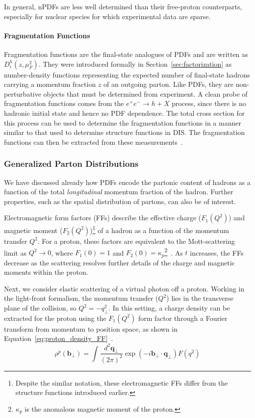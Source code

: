 In general, nPDFs are less well determined than their free-proton counterparts, especially for nuclear species for which experimental data are sparse.

\FloatBarrier
\paragraph{Fragmentation Functions}
Fragmentation functions are the final-state analogues of PDFs and are written as $D_i^h(z,\mu_F^2)$.
They were introduced formally in Section~\ref{sec:factorization} as number-density functions representing the expected number of final-state hadrons carrying a momentum fraction $z$ of an outgoing parton.
Like PDFs, they are non-perturbative objects that must be determined from experiment.
A clean probe of fragmentation functions comes from the $e^+e^-\rightarrow h+X$ process, since there is no hadronic initial state and hence no PDF dependence.
The total cross section for this process can be used to determine the fragmentation functions in a manner similar to that used to determine structure functions in DIS.
The fragmentation functions can then be extracted from these measurements~\cite{pdg}.

\subsubsection{Generalized Parton Distributions}

We have discussed already how PDFs encode the partonic content of hadrons as a function of the total \textit{longitudinal} momentum fraction of the hadron.
Further properties, such as the spatial distribution of partons, can also be of interest.

Electromagnetic form factors (FFs) describe the effective charge ($F_1(Q^2)$) and magnetic moment ($F_2(Q^2)$)\footnote{Despite the similar notation, these electromagnetic FFs differ from the structure functions introduced earlier.} of a hadron as a function of the momentum transfer $Q^2$.
For a proton, these factors are equivalent to the Mott-scattering limit as $Q^2\rightarrow0$, where $F_1(0)=1$ and $F_2(0)=\kappa_p$\footnote{$\kappa_p$ is the anomalous magnetic moment of the proton.}~\cite{EMFF}.
As $t$ increases, the FFs decrease as the scattering resolves further details of the charge and magnetic moments within the proton.

Next, we consider elastic scattering of a virtual photon off a proton.
Working in the light-front formalism, the momentum transfer ($Q^2$) lies in the transverse plane of the collision, so $Q^2 = -q^2_\perp$.
In this setting, a charge density can be extracted for the proton using the $F_1(Q^2)$ form factor through a Fourier transform from momentum to position space, as shown in Equation~\ref{eq:proton_density_FF}~\cite{Brodsky:CT}.
\begin{equation}
    \label{eq:proton_density_FF}
    \rho^p (\mathbf{b}_\perp) = \int \frac{d^2\mathbf{q}_\perp}{(2\pi)^2} \exp{\left(-i\mathbf{b}_\perp\cdot \mathbf{q}_\perp\right)} F(q^2)
\end{equation}

